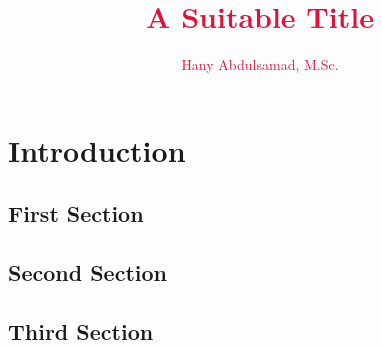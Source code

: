 \documentclass{iasthesis}
\newcommand{\filterminitoc}[1]{#1}
\newcommand{\minitocsection}{\begingroup\renewcommand{\filterminitoc}[1]{}\minitoc\endgroup}
\begin{document}
	
	\title{\textcolor{crimson} {A Suitable Title}}
	\author{\textcolor{crimson} {Hany Abdulsamad, M.Sc.}}
	
	\maketitle
	
	\begin{dedication}
		
	\end{dedication}

	
	
	\begin{acknowledgements}
		
	\end{acknowledgements}

	\begin{kurzfassung}
		\begin{otherlanguage}{ngerman}
			
		\end{otherlanguage}
	\end{kurzfassung}

	\begin{abstract}
		
	\end{abstract}
	
	\dominitoc[n]
	
	\tableofcontents
	\clearpage
	
	
		
	\chapter{Introduction}
	\minitocsection 
	\kant
	\section{First Section}
	\kant
	\section{Second Section}
	\kant
	\section{Third Section}
	\kant
	
\end{document}
